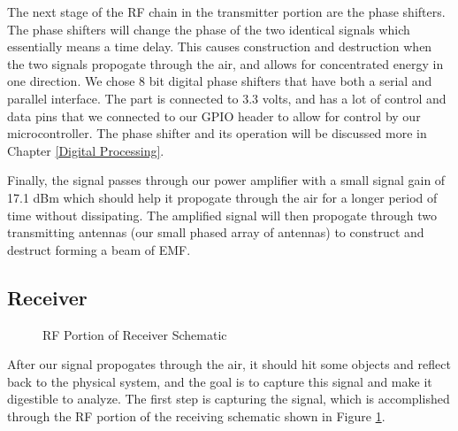 The next stage of the RF chain in the transmitter portion are the phase shifters. The phase shifters will change the phase
of the two identical signals which essentially means a time delay. This causes construction and destruction when the
two signals propogate through the air, and allows for concentrated energy in one direction. We chose 8 bit digital 
phase shifters that have both a serial and parallel interface. The part is connected to 3.3 volts, and has a lot of control and
data pins that we connected to our GPIO header to allow for control by our microcontroller. The phase shifter and its
operation will be discussed more in Chapter \ref{Digital Processing}. 

Finally, the signal passes through our power amplifier with a small signal gain of 17.1 dBm which should help it propogate
through the air for a longer period of time without dissipating. The amplified signal will then propogate through two transmitting
antennas (our small phased array of antennas) to construct and destruct forming a beam of EMF.

\subsection{Receiver}
\begin{figure}[H]
  \centering
\caption{RF Portion of Receiver Schematic}
\label{img:receiverschem}
\end{figure}
After our signal propogates through the air, it should hit some objects and reflect back to the physical system, and the
goal is to capture this signal and make it digestible to analyze. The first step is capturing the signal, which is accomplished
through the RF portion of the receiving schematic shown in Figure \ref{img:receiverschem}.

